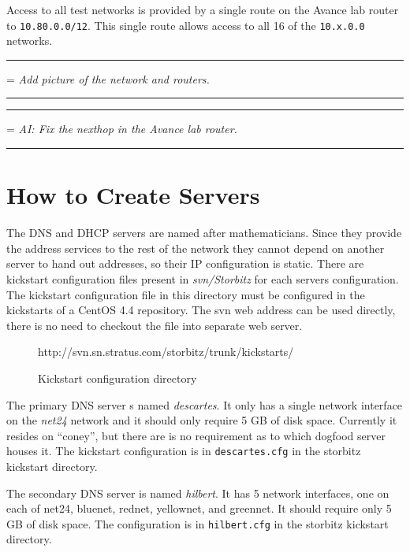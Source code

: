\documentclass[twoside]{article}
\newenvironment{note}
{\begin{center}\begin{minipage}{0.8\textwidth}
\vspace{2ex}\hrule\vspace{1ex}
\parskip=\medskipamount
\em}
{\par 
\vspace{1ex}\hrule\vspace{2ex}
\end{minipage}\end{center}}
\begin{document}
Access to all test networks is provided by a single route on the Avance
lab router to \verb+10.80.0.0/12+.
This single route allows access to all 16 of the \verb+10.x.0.0+ networks.

\begin{note}
Add picture of the network and routers.
\end{note}

\begin{note}
AI: Fix the nexthop in the Avance lab router.
\end{note}


\section{How to Create Servers}

The DNS and DHCP servers are named after mathematicians.
Since they provide the address services to the rest of the
network they cannot depend on another server to hand out
addresses, so their IP configuration is static.
There are kickstart configuration files present in {\em svn/Storbitz}
for each servers configuration.
The kickstart configuration file in this directory must be configured
in the kickstarts of a CentOS 4.4 repository.
The svn web address can be used directly, there is no need to
checkout the file into separate web server.

\begin{figure}[!h]
\begin{center}
\begin{boxedverbatim}
http://svn.sn.stratus.com/storbitz/trunk/kickstarts/
\end{boxedverbatim}
\end{center}
\caption{Kickstart configuration directory}\label{kickstart:config}
\end{figure}

The primary DNS server s named {\em descartes}.
It only has a single network interface on the {\em net24} network
and it should only require 5 GB of disk space.
Currently it resides on ``coney'', but there are is no requirement
as to which dogfood server houses it.
The kickstart configuration is in
\verb+descartes.cfg+ in the storbitz kickstart directory.

The secondary DNS server is named {\em hilbert}.
It has 5 network interfaces, one on each of net24, bluenet,
rednet, yellownet, and greennet.
It should require only 5 GB of disk space.
The configuration is in \verb+hilbert.cfg+ in the storbitz
kickstart directory.
\end{document}
